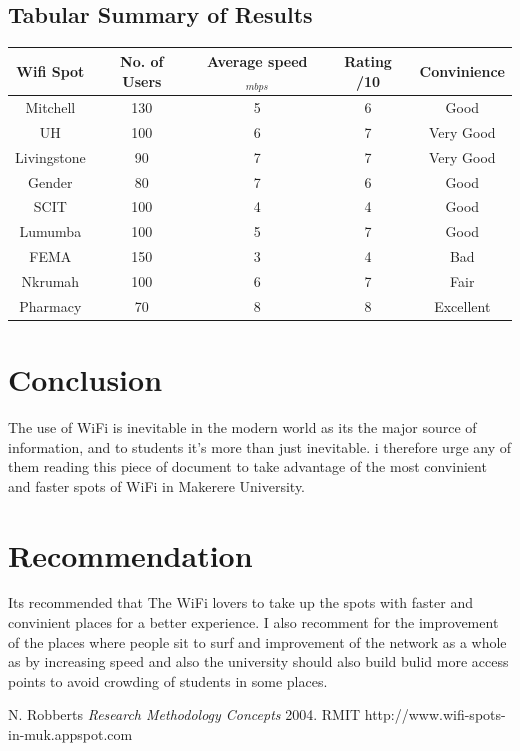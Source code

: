 \documentclass[12pt, a4paper]{article}
\begin{document}
\subsection{Tabular Summary of Results}
\begin{center}
\begin{tabular}{|| c | c | c | c | c ||}
\hline \textbf{Wifi Spot} & \textbf{No. of Users} & \textbf{Average speed$_{mbps}$} & \textbf{Rating /10} & \textbf{Convinience}\\
[0.5ex]
\hline
\hline Mitchell & 130 & 5 & 6 & Good\\
\hline UH & 100 & 6 & 7 & Very Good\\
\hline Livingstone & 90 & 7 & 7 & Very Good\\
\hline Gender & 80 & 7 & 6 & Good\\
\hline SCIT & 100 & 4 & 4 & Good\\
\hline Lumumba & 100 & 5 & 7 & Good\\
\hline FEMA & 150 & 3 & 4 & Bad\\
\hline Nkrumah & 100 & 6 & 7 & Fair\\
\hline Pharmacy & 70 & 8 & 8 & Excellent\\
[0.5ex]
\hline 
\end{tabular}
\end{center}

\section{Conclusion}
The use of WiFi is inevitable in the modern world as its the major source of information, and to students it's more than just inevitable. i therefore urge any of them reading this piece of document to take advantage of the most convinient and faster spots of WiFi in Makerere University. 

\section{Recommendation}
Its recommended that The WiFi lovers to take up the spots with faster and convinient places for a better experience.
I also recomment for the improvement of the places where people sit to surf and improvement of the network as a whole as by increasing speed and also the university should also build bulid more access points to avoid crowding of students in some places.
\clearpage

\begin{thebibliography}{1}
\bibitem{} N. Robberts {\em  Research Methodology Concepts} 2004. RMIT
\bibitem{} http://www.wifi-spots-in-muk.appspot.com
\end{thebibliography}
\end{document}
